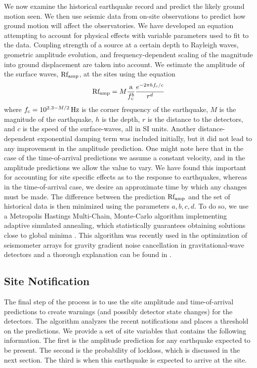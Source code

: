\documentclass[twocolumn, aps, superscriptaddress]{revtex4}
\begin{document}
We now examine the historical earthquake record and predict the likely ground motion seen. We then use seismic data from on-site observations to predict how ground motion will affect the observatories. We have developed an equation attempting to account for physical effects with variable parameters used to fit to the data. Coupling strength of a source at a certain depth to Rayleigh waves, geometric amplitude evolution, and frequency-dependent scaling of the magnitude into ground displacement are taken into account. We estimate the amplitude of the surface waves, $\rm Rf_{amp}$, at the sites using the equation
\begin{equation}
{\rm Rf_{amp}} = M \frac{\rm a}{f_c^{b}} \frac{e^{-2 \pi h f_{\rm c}/c}}{r^{d}}
\label{eq:Rfamp} 
\end{equation}
where $f_{\rm c} = 10^{2.3-M/2}\,\rm Hz$ is the corner frequency of the earthquake,  $M$ is the magnitude of the earthquake, $h$ is the depth, $r$ is the distance to the detectors, and $c$ is the speed of the surface-waves, all in SI units. Another distance-dependent exponential damping term was included initially, but it did not lead to any improvement in the amplitude prediction. One might note here that in the case of the time-of-arrival predictions we assume a constant velocity, and in the amplitude predictions we allow the value to vary. We have found this important for accounting for site specific effects as to the response to earthquakes, whereas in the time-of-arrival case, we desire an approximate time by which any changes must be made.
The difference between the prediction ${\rm Rf_{amp}}$ and the set of historical data is then minimized using the parameters $a,b,c,d$.
To do so, we use a Metropolis Hastings Multi-Chain, Monte-Carlo algorithm implementing adaptive simulated annealing, which statistically guarantees obtaining solutions close to global minima \cite{KiGe1983,In2000}. This algorithm was recently used in the optimization of seismometer arrays for gravity gradient noise cancellation in gravitational-wave detectors and a thorough explanation can be found in \cite{CoMu2016}. 

\subsection{Site Notification}
The final step of the process is to use the site amplitude and time-of-arrival predictions to create warnings (and possibly detector state changes) for the detectors. The algorithm analyzes the recent notifications and places a threshold on the predictions. We provide a set of site variables that contains the following information. The first is the amplitude prediction for any earthquake expected to be present.
The second is the probability of lockloss, which is discussed in the next section. The third is when this earthquake is expected to arrive at the site.
		
\end{document}
